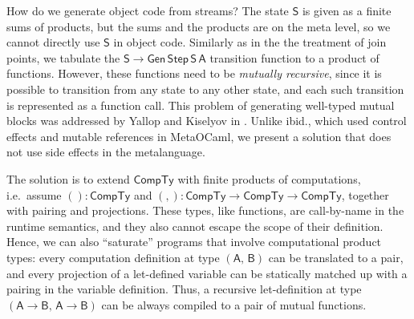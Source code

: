 \documentclass[acmsmall,screen,review,anonymous]{acmart}
\newcommand{\msf}[1]{{\mathsf{#1}}}
\newcommand{\vA}{\mathsf{A}}
\newcommand{\vB}{\mathsf{B}}
\newcommand{\vS}{\mathsf{S}}
\newcommand{\CTy}{\msf{CompTy}}
\theoremstyle{remark}
\newcommand{\Gen}{\msf{Gen}}
\newcommand{\Step}{\msf{Step}}
\begin{document}
How do we generate object code from streams? The state $\vS$ is given as a
finite sums of products, but the sums and the products are on the meta level, so
we cannot directly use $\vS$ in object code. Similarly as in the the treatment
of join points, we tabulate the $\vS \to \Gen\,\Step\,\vS\,\vA$ transition
function to a product of functions. However, these functions need to be
\emph{mutually recursive}, since it is possible to transition from any state to
any other state, and each such transition is represented as a function call.
This problem of generating well-typed mutual blocks was addressed by Yallop and
Kiselyov in \cite{DBLP:conf/pepm/YallopK19}. Unlike ibid., which used control
effects and mutable references in MetaOCaml, we present a solution that does not
use side effects in the metalanguage.

The solution is to extend $\CTy$ with finite products of computations,
i.e.\ assume $() : \CTy$ and $({,}) : \CTy \to \CTy \to \CTy$, together with
pairing and projections. These types, like functions, are call-by-name in the
runtime semantics, and they also cannot escape the scope of their definition.
Hence, we can also ``saturate'' programs that involve computational product types:
every computation definition at type $(\vA,\,\vB)$ can be translated to a pair,
and every projection of a let-defined variable can be statically matched up with
a pairing in the variable definition. Thus, a recursive let-definition at type
$(\vA \to \vB,\,\vA \to \vB)$ can be always compiled to a pair of mutual
functions.
\end{document}
